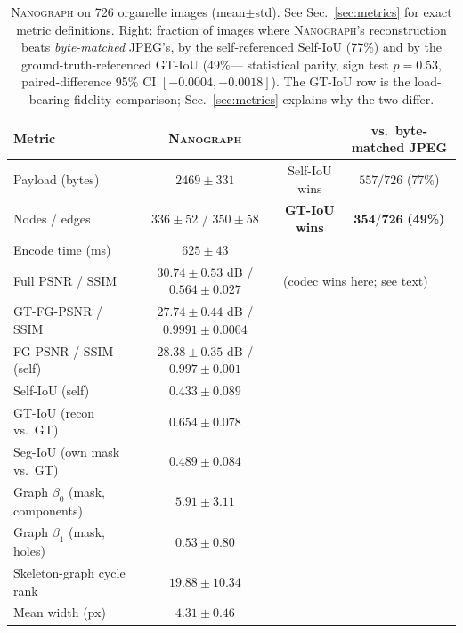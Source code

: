 \documentclass[10pt,a4paper]{article}
\newcommand{\method}{\textnormal{\textsc{Nanograph}}\xspace}
\begin{document}
\begin{table}[t]
\centering
\caption{\method on 726 organelle images (mean$\pm$std). See
Sec.~\ref{sec:metrics} for exact metric definitions. Right: fraction of images where \method's
reconstruction beats \emph{byte-matched} JPEG's, by the self-referenced
Self-IoU (77\%) and by the ground-truth-referenced GT-IoU (49\%---
statistical parity, sign test $p=0.53$, paired-difference 95\% CI
$[-0.0004,+0.0018]$). The GT-IoU row is the load-bearing fidelity
comparison; Sec.~\ref{sec:metrics} explains why the two differ.}
\label{tab:nmi}
\footnotesize
\setlength{\tabcolsep}{5pt}
\begin{tabular}{lccc}
\toprule
Metric & \method & & vs.\ byte-matched JPEG \\
\midrule
Payload (bytes)      & $2469\pm331$   & Self-IoU wins    & $557/726$ (77\%)\\
Nodes / edges         & $336\pm52$ / $350\pm58$ & \textbf{GT-IoU wins} & $\mathbf{354/726}$ \textbf{(49\%)}\\
Encode time (ms)     & $625\pm43$     & \multicolumn{2}{l}{}\\
\midrule
Full PSNR / SSIM     & $30.74\pm0.53$ dB / $0.564\pm0.027$ & \multicolumn{2}{l}{(codec wins here; see text)}\\
GT-FG-PSNR / SSIM    & $27.74\pm0.44$ dB / $0.9991\pm0.0004$ & \multicolumn{2}{l}{}\\
FG-PSNR / SSIM (self)& $28.38\pm0.35$ dB / $0.997\pm0.001$ & \multicolumn{2}{l}{}\\
Self-IoU (self)      & $0.433\pm0.089$& \multicolumn{2}{l}{}\\
GT-IoU (recon vs.\ GT)& $0.654\pm0.078$& \multicolumn{2}{l}{}\\
Seg-IoU (own mask vs.\ GT)& $0.489\pm0.084$& \multicolumn{2}{l}{}\\
\midrule
Graph $\beta_0$ (mask, components) & $5.91\pm3.11$ & \multicolumn{2}{l}{}\\
Graph $\beta_1$ (mask, holes)      & $0.53\pm0.80$ & \multicolumn{2}{l}{}\\
Skeleton-graph cycle rank          & $19.88\pm10.34$ & \multicolumn{2}{l}{}\\
Mean width (px)                    & $4.31\pm0.46$ & \multicolumn{2}{l}{}\\
\bottomrule
\end{tabular}
\end{table}
\end{document}
